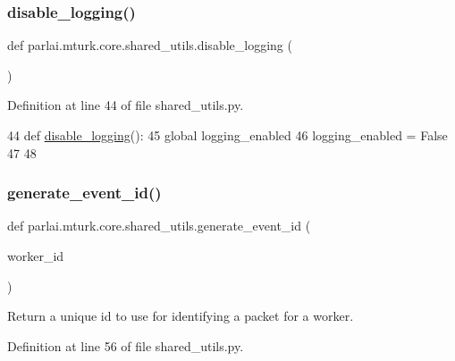 \subsubsection{\texorpdfstring{disable\+\_\+logging()}{disable\_logging()}}
{\footnotesize\ttfamily def parlai.\+mturk.\+core.\+shared\+\_\+utils.\+disable\+\_\+logging (\begin{DoxyParamCaption}{ }\end{DoxyParamCaption})}



Definition at line 44 of file shared\+\_\+utils.\+py.


\begin{DoxyCode}
44 \textcolor{keyword}{def }\hyperlink{namespaceparlai_1_1mturk_1_1core_1_1shared__utils_ac9c2cb4e45eb5bb480df0cd8b18c64da}{disable\_logging}():
45     \textcolor{keyword}{global} logging\_enabled
46     logging\_enabled = \textcolor{keyword}{False}
47 
48 
\end{DoxyCode}
\mbox{\label{namespaceparlai_1_1mturk_1_1core_1_1shared__utils_aba2e4d48063dafc80e931f8925dbb755}} 
\subsubsection{\texorpdfstring{generate\+\_\+event\+\_\+id()}{generate\_event\_id()}}
{\footnotesize\ttfamily def parlai.\+mturk.\+core.\+shared\+\_\+utils.\+generate\+\_\+event\+\_\+id (\begin{DoxyParamCaption}\item[{}]{worker\+\_\+id }\end{DoxyParamCaption})}

\begin{DoxyVerb}Return a unique id to use for identifying a packet for a worker.
\end{DoxyVerb}
 

Definition at line 56 of file shared\+\_\+utils.\+py.


